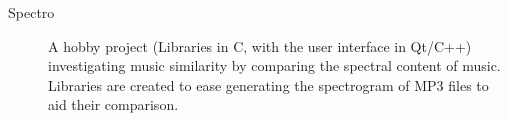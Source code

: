 \begin{description}

\item[Spectro]
A hobby project (Libraries in C, with the user interface in Qt/C++) investigating music similarity by comparing the spectral content of music. Libraries are created to ease generating the spectrogram of MP3 files to aid their comparison.

\end{description}

